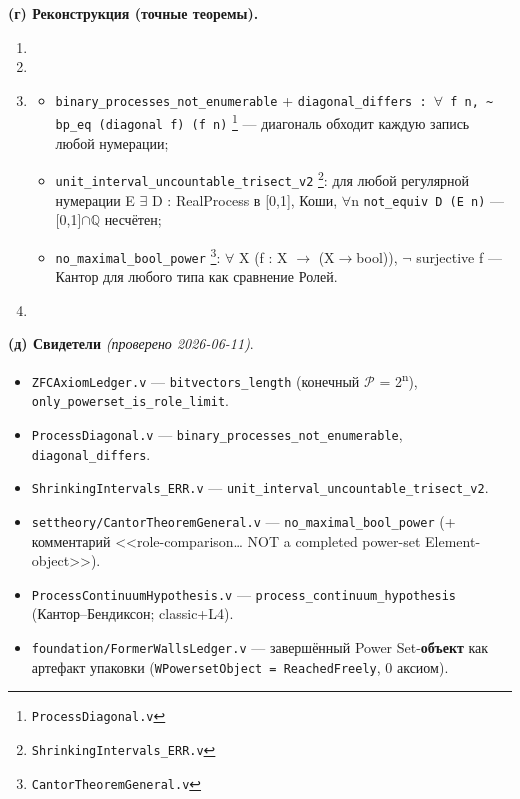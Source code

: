 \documentclass[11pt,a4paper]{article}
\begin{document}
\textbf{(г) Реконструкция (точные теоремы).}
\begin{enumerate}
\item 
\item 
\item 
\begin{itemize}
\item \texttt{binary\_\allowbreak{}processes\_\allowbreak{}not\_\allowbreak{}enumerable} + \texttt{diagonal\_\allowbreak{}differs : $\forall$ f n,\allowbreak{} \textasciitilde{} bp\_\allowbreak{}eq (diagonal f) (f n)} \footnote{\texttt{Process\allowbreak{}Diagonal.v}} --- диагональ обходит каждую запись любой нумерации;
\item \texttt{unit\_\allowbreak{}interval\_\allowbreak{}uncountable\_\allowbreak{}trisect\_\allowbreak{}v2} \footnote{\texttt{Shrinking\allowbreak{}Intervals\_\allowbreak{}ERR.v}}: для любой регулярной нумерации E $\exists$ D : RealProcess в [0,1], Коши, $\forall$n \texttt{not\_\allowbreak{}equiv D (E n)} --- [0,1]$\cap$$\mathbb{Q}$ несчётен;
\item \texttt{no\_\allowbreak{}maximal\_\allowbreak{}bool\_\allowbreak{}power} \footnote{\texttt{Cantor\allowbreak{}Theorem\allowbreak{}General.v}}: $\forall$ X (f : X $\to$ (X$\to$bool)), $\neg$ surjective f --- Кантор для любого типа как сравнение Ролей.
\end{itemize}
\item 
\end{enumerate}

\textbf{(д) Свидетели} \emph{(проверено 2026-06-11)}.
\begin{itemize}
\item \texttt{ZFCAxiom\allowbreak{}Ledger.v} --- \texttt{bitvectors\_\allowbreak{}length} (конечный $\mathcal{P}$ = 2\textsuperscript{n}), \texttt{only\_\allowbreak{}powerset\_\allowbreak{}is\_\allowbreak{}role\_\allowbreak{}limit}.
\item \texttt{Process\allowbreak{}Diagonal.v} --- \texttt{binary\_\allowbreak{}processes\_\allowbreak{}not\_\allowbreak{}enumerable}, \texttt{diagonal\_\allowbreak{}differs}.
\item \texttt{Shrinking\allowbreak{}Intervals\_\allowbreak{}ERR.v} --- \texttt{unit\_\allowbreak{}interval\_\allowbreak{}uncountable\_\allowbreak{}trisect\_\allowbreak{}v2}.
\item \texttt{settheory/\allowbreak{}Cantor\allowbreak{}Theorem\allowbreak{}General.v} --- \texttt{no\_\allowbreak{}maximal\_\allowbreak{}bool\_\allowbreak{}power} (+ комментарий <<role-comparison\ldots{} NOT a completed power-set Element-object>>).
\item \texttt{Process\allowbreak{}Continuum\allowbreak{}Hypothesis.v} --- \texttt{process\_\allowbreak{}continuum\_\allowbreak{}hypothesis} (Кантор--Бендиксон; classic+L4).
\item \texttt{foundation/\allowbreak{}Former\allowbreak{}Walls\allowbreak{}Ledger.v} --- завершённый Power Set-\textbf{объект} как артефакт упаковки (\texttt{WPowerset\allowbreak{}Object = Reached\allowbreak{}Freely}, 0 аксиом).
\end{itemize}
\end{document}
